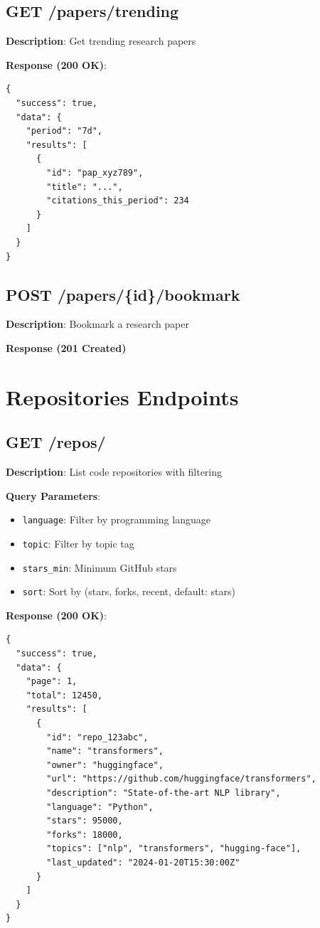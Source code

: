 \documentclass[12pt,a4paper]{report}
\begin{document}
\section{GET /papers/trending}

\textbf{Description}: Get trending research papers

\textbf{Response (200 OK)}:
\begin{lstlisting}
{
  "success": true,
  "data": {
    "period": "7d",
    "results": [
      {
        "id": "pap_xyz789",
        "title": "...",
        "citations_this_period": 234
      }
    ]
  }
}
\end{lstlisting}

\section{POST /papers/\{id\}/bookmark}

\textbf{Description}: Bookmark a research paper

\textbf{Response (201 Created)}

\chapter{Repositories Endpoints}

\section{GET /repos/}

\textbf{Description}: List code repositories with filtering

\textbf{Query Parameters}:
\begin{itemize}
    \item \texttt{language}: Filter by programming language
    \item \texttt{topic}: Filter by topic tag
    \item \texttt{stars\_min}: Minimum GitHub stars
    \item \texttt{sort}: Sort by (stars, forks, recent, default: stars)
\end{itemize}

\textbf{Response (200 OK)}:
\begin{lstlisting}
{
  "success": true,
  "data": {
    "page": 1,
    "total": 12450,
    "results": [
      {
        "id": "repo_123abc",
        "name": "transformers",
        "owner": "huggingface",
        "url": "https://github.com/huggingface/transformers",
        "description": "State-of-the-art NLP library",
        "language": "Python",
        "stars": 95000,
        "forks": 18000,
        "topics": ["nlp", "transformers", "hugging-face"],
        "last_updated": "2024-01-20T15:30:00Z"
      }
    ]
  }
}
\end{lstlisting}
\end{document}
